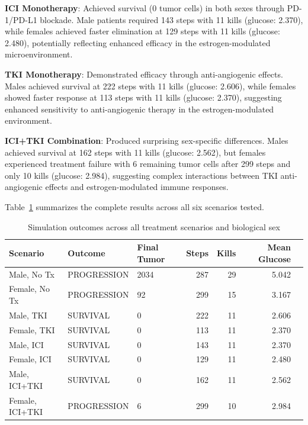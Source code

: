 \textbf{ICI Monotherapy}: Achieved survival (0 tumor cells) in both sexes through PD-1/PD-L1 blockade. Male patients required 143 steps with 11 kills (glucose: 2.370), while females achieved faster elimination at 129 steps with 11 kills (glucose: 2.480), potentially reflecting enhanced efficacy in the estrogen-modulated microenvironment.

\textbf{TKI Monotherapy}: Demonstrated efficacy through anti-angiogenic effects. Males achieved survival at 222 steps with 11 kills (glucose: 2.606), while females showed faster response at 113 steps with 11 kills (glucose: 2.370), suggesting enhanced sensitivity to anti-angiogenic therapy in the estrogen-modulated environment.

\textbf{ICI+TKI Combination}: Produced surprising sex-specific differences. Males achieved survival at 162 steps with 11 kills (glucose: 2.562), but females experienced treatment failure with 6 remaining tumor cells after 299 steps and only 10 kills (glucose: 2.984), suggesting complex interactions between TKI anti-angiogenic effects and estrogen-modulated immune responses.

Table~\ref{tab:treatment-outcomes} summarizes the complete results across all six scenarios tested.

\begin{table}[h]
\centering
\caption{Simulation outcomes across all treatment scenarios and biological sex}
\label{tab:treatment-outcomes}
\begin{tabular}{lllrrrl}
\toprule
\textbf{Scenario} & \textbf{Outcome} & \textbf{Final Tumor} & \textbf{Steps} & \textbf{Kills} & \textbf{Mean Glucose} \\
\midrule
Male, No Tx & PROGRESSION & 2034 & 287 & 29 & 5.042 \\
Female, No Tx & PROGRESSION & 92 & 299 & 15 & 3.167 \\
Male, TKI & SURVIVAL & 0 & 222 & 11 & 2.606 \\
Female, TKI & SURVIVAL & 0 & 113 & 11 & 2.370 \\
Male, ICI & SURVIVAL & 0 & 143 & 11 & 2.370 \\
Female, ICI & SURVIVAL & 0 & 129 & 11 & 2.480 \\
Male, ICI+TKI & SURVIVAL & 0 & 162 & 11 & 2.562 \\
Female, ICI+TKI & PROGRESSION & 6 & 299 & 10 & 2.984 \\
\bottomrule
\end{tabular}
\end{table}

